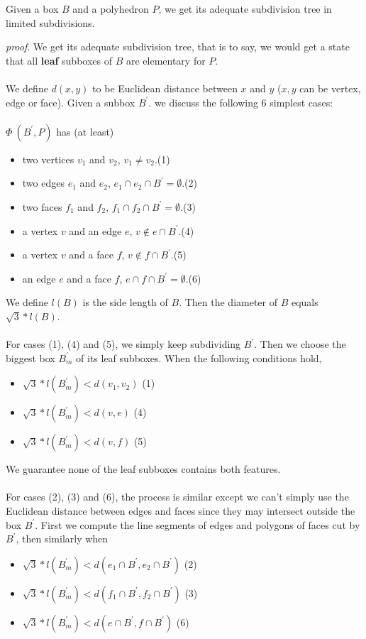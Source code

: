 \documentclass[twoside]{article}
\begin{document}
\begin{multicols}{2}
\begin{lemma}
Given a box $B$ and a polyhedron $P$, we get its adequate subdivision tree in limited subdivisions.
\end{lemma}
\textit{proof}. We get its adequate subdivision tree, that is to say, we would get a state that all \textbf{leaf} subboxes of $B$ are elementary for $P$.
\\
\\
\indent We define $d(x,y)$ to be Euclidean distance between $x$ and $y$ ($x,y$ can be vertex, edge or face). Given a subbox $B^\prime$.
\iffalse we discuss the following 6 simplest cases:
\\
\\
$\Phi\ (B^\prime, P)$ has (at least)
		\begin{itemize}
			\item two vertices $v_1$ and $v_2$, $v_1 \neq v_2$.\hfill (1)
			\item two edges $e_1$ and $e_2$, $e_1 \cap e_2 \cap B^\prime = \emptyset$.\hfill (2)
			\item two faces $f_1$ and $f_2$, $f_1 \cap f_2 \cap B^\prime = \emptyset$.\hfill (3)
			\item a vertex $v$ and an edge $e$, $v \notin e \cap B^\prime$.\hfill (4)
			\item a vertex $v$ and a face $f$, $v \notin f \cap B^\prime$.\hfill (5)
			\item an edge $e$ and a face $f$, $e \cap f \cap B^\prime = \emptyset$.\hfill (6)
		\end{itemize}

We define $l(B)$ is the side length of $B$. Then the diameter of $B$ equals $\sqrt{3} * l(B)$.
\\
\\
\indent For cases (1), (4) and (5), we simply keep subdividing $B^\prime$. Then we choose the biggest box $B_m^\prime$ of its leaf subboxes. When the following conditions hold, 
\begin{itemize}
\item $\sqrt{3} * l(B_m^\prime) < d(v_1,v_2)$ \hfill (1)
\item $\sqrt{3} * l(B_m^\prime) < d(v,e)$ \hfill (4)
\item $\sqrt{3} * l(B_m^\prime) < d(v,f)$ \hfill (5)
\end{itemize}
\indent We guarantee none of the leaf subboxes contains both features.
\\
\\
\indent For cases (2), (3) and (6), the process is similar except we can't simply use the Euclidean distance between edges and faces since they may intersect outside the box $B^\prime$. First we compute the line segments of edges and polygons of faces cut by $B^\prime$, then similarly when
 \begin{itemize}
 \item $\sqrt{3} * l(B_m^\prime) < d(e_1\cap B^\prime,e_2\cap B^\prime)$ \hfill (2)
 \item $\sqrt{3} * l(B_m^\prime) < d(f_1\cap B^\prime,f_2\cap B^\prime)$ \hfill (3)
 \item $\sqrt{3} * l(B_m^\prime) < d(e\cap B^\prime,f\cap B^\prime)$ \hfill (6)
 \end{itemize}
 

\end{multicols}
\end{document}
